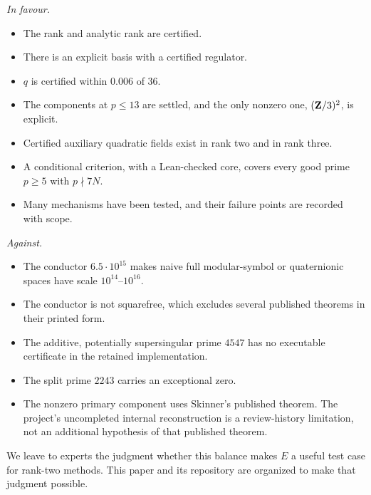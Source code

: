 \emph{In favour.}
\begin{itemize}[leftmargin=*]
\item The rank and analytic rank are certified.
\item There is an explicit basis with a certified regulator.
\item $q$ is certified within $0.006$ of $36$.
\item The components at $p\le13$ are settled, and the only nonzero one, $(\mathbf{Z}/3)^2$, is explicit.
\item Certified auxiliary quadratic fields exist in rank two and in rank three.
\item A conditional criterion, with a Lean-checked core, covers every good prime $p\ge5$ with $p\nmid7N$.
\item Many mechanisms have been tested, and their failure points are recorded with scope.
\end{itemize}

\emph{Against.}
\begin{itemize}[leftmargin=*]
\item The conductor $6.5\cdot10^{15}$ makes naive full modular-symbol or quaternionic spaces have scale $10^{14}$--$10^{16}$.
\item The conductor is not squarefree, which excludes several published theorems in their printed form.
\item The additive, potentially supersingular prime $4547$ has no executable certificate in the retained implementation.
\item The split prime $2243$ carries an exceptional zero.
\item The nonzero primary component uses Skinner's published theorem. The project's uncompleted internal reconstruction is a review-history limitation, not an additional hypothesis of that published theorem.
\end{itemize}

We leave to experts the judgment whether this balance makes $E$ a useful test case for rank-two methods. This paper and its repository are organized to make that judgment possible.
